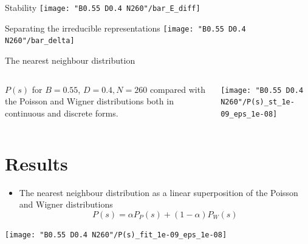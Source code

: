 \documentclass[a4,compress]{beamer}
\begin{document}

\begin{frame}{Stability}
  \centering
  \texttt{[image: "B0.55 D0.4 N260"/bar\_E\_diff]}
\end{frame}


\begin{frame}{Separating the irreducible representations}
  \texttt{[image: "B0.55 D0.4 N260"/bar\_delta]}
\end{frame}


\begin{frame}{The nearest neighbour distribution}
  \begin{columns}[c]
  \begin{column}{0.3\textwidth}
    \(P(s)\) for \(B=0.55\), \({D=0.4, N=260}\) compared with the Poisson
    and Wigner distributions both in continuous and discrete forms.
  \end{column}
  \begin{column}{0.7\textwidth}
    \texttt{[image: "B0.55 D0.4 N260"/P(s)\_st\_1e-09\_eps\_1e-08]}  %
  \end{column}
  \end{columns}
\end{frame}

\section{Results}


\begin{frame}
  \begin{itemize}
    \item The nearest neighbour distribution as a linear superposition
    of the Poisson and Wigner distributions
    \[
      P(s) = \alpha P_P(s) + (1-\alpha) P_W(s)
    \]
  \end{itemize}
\end{frame}


\begin{frame}
  \texttt{[image: "B0.55 D0.4 N260"/P(s)\_fit\_1e-09\_eps\_1e-08]}  %
\end{frame}
\end{document}

